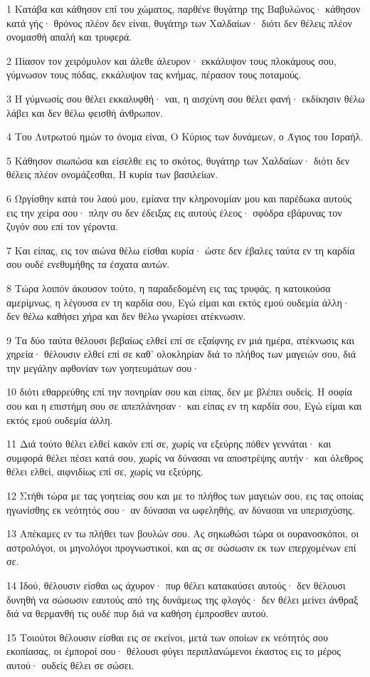 \par 1 Κατάβα και κάθησον επί του χώματος, παρθένε θυγάτηρ της Βαβυλώνος· κάθησον κατά γής· θρόνος πλέον δεν είναι, θυγάτηρ των Χαλδαίων· διότι δεν θέλεις πλέον ονομασθή απαλή και τρυφερά.
\par 2 Πίασον τον χειρόμυλον και άλεθε άλευρον· εκκάλυψον τους πλοκάμους σου, γύμνωσον τους πόδας, εκκάλυψον τας κνήμας, πέρασον τους ποταμούς.
\par 3 Η γύμνωσίς σου θέλει εκκαλυφθή· ναι, η αισχύνη σου θέλει φανή· εκδίκησιν θέλω λάβει και δεν θέλω φεισθή άνθρωπον.
\par 4 Του Λυτρωτού ημών το όνομα είναι, Ο Κύριος των δυνάμεων, ο Άγιος του Ισραήλ.
\par 5 Κάθησον σιωπώσα και είσελθε εις το σκότος, θυγάτηρ των Χαλδαίων· διότι δεν θέλεις πλέον ονομάζεσθαι, Η κυρία των βασιλείων.
\par 6 Ωργίσθην κατά του λαού μου, εμίανα την κληρονομίαν μου και παρέδωκα αυτούς εις την χείρα σου· πλην συ δεν έδειξας εις αυτούς έλεος· σφόδρα εβάρυνας τον ζυγόν σου επί τον γέροντα.
\par 7 Και είπας, εις τον αιώνα θέλω είσθαι κυρία· ώστε δεν έβαλες ταύτα εν τη καρδία σου ουδέ ενεθυμήθης τα έσχατα αυτών.
\par 8 Τώρα λοιπόν άκουσον τούτο, η παραδεδομένη εις τας τρυφάς, η κατοικούσα αμερίμνως, η λέγουσα εν τη καρδία σου, Εγώ είμαι και εκτός εμού ουδεμία άλλη· δεν θέλω καθήσει χήρα και δεν θέλω γνωρίσει ατέκνωσιν.
\par 9 Τα δύο ταύτα θέλουσι βεβαίως ελθεί επί σε εξαίφνης εν μιά ημέρα, ατέκνωσις και χηρεία· θέλουσιν ελθεί επί σε καθ' ολοκληρίαν διά το πλήθος των μαγειών σου, διά την μεγάλην αφθονίαν των γοητευμάτων σου·
\par 10 διότι εθαρρεύθης επί την πονηρίαν σου και είπας, δεν με βλέπει ουδείς. Η σοφία σου και η επιστήμη σου σε απεπλάνησαν· και είπας εν τη καρδία σου, Εγώ είμαι και εκτός εμού ουδεμία άλλη.
\par 11 Διά τούτο θέλει ελθεί κακόν επί σε, χωρίς να εξεύρης πόθεν γεννάται· και συμφορά θέλει πέσει κατά σου, χωρίς να δύνασαι να αποστρέψης αυτήν· και όλεθρος θέλει ελθεί, αιφνιδίως επί σε, χωρίς να εξεύρης.
\par 12 Στήθι τώρα με τας γοητείας σου και με το πλήθος των μαγειών σου, εις τας οποίας ηγωνίσθης εκ νεότητός σου· αν δύνασαι να ωφεληθής, αν δύνασαι να υπερισχύσης.
\par 13 Απέκαμες εν τω πλήθει των βουλών σου. Ας σηκωθώσι τώρα οι ουρανοσκόποι, οι αστρολόγοι, οι μηνολόγοι προγνωστικοί, και ας σε σώσωσιν εκ των επερχομένων επί σε.
\par 14 Ιδού, θέλουσιν είσθαι ως άχυρον· πυρ θέλει κατακαύσει αυτούς· δεν θέλουσι δυνηθή να σώσωσιν εαυτούς από της δυνάμεως της φλογός· δεν θέλει μείνει άνθραξ διά να θερμανθή τις ουδέ πυρ διά να καθήση έμπροσθεν αυτού.
\par 15 Τοιούτοι θέλουσιν είσθαι εις σε εκείνοι, μετά των οποίων εκ νεότητός σου εκοπίασας, οι έμποροί σου· θέλουσι φύγει περιπλανώμενοι έκαστος εις το μέρος αυτού· ουδείς θέλει σε σώσει.

